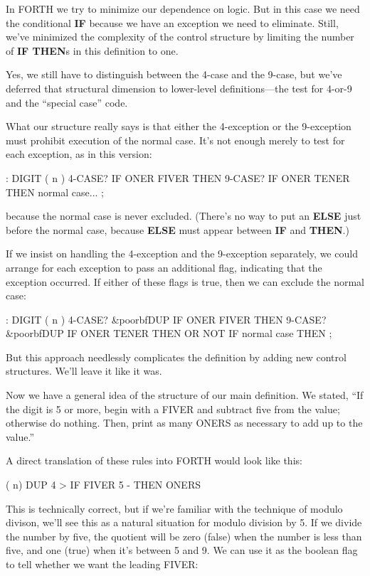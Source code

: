 In FORTH we try to minimize our dependence on logic. But in this
case we need the conditional \textbf{IF} because we have an exception we need to
eliminate. Still, we've minimized the complexity of the control structure
by limiting the number of \textbf{IF THEN}s in this definition to one.

Yes, we still have to distinguish between the 4-case and the 9-case,
but we've deferred that structural dimension to lower-level
definitions---the test for 4-or-9 and the ``special case'' code.

What our structure really says is that either the 4-exception or the
9-exception must prohibit execution of the normal case. It's not enough
merely to test for each exception, as in this version:

\begin{Code}
: DIGIT  ( n )  4-CASE? IF  ONER FIVER  THEN
                9-CASE? IF  ONER TENER  THEN
                normal case... ;
\end{Code}

because the normal case is never excluded. (There's no way to put an
\textbf{ELSE} just before the normal case, because \textbf{ELSE} must appear between
\textbf{IF} and \textbf{THEN}.)

If we insist on handling the 4-exception and the 9-exception
separately, we could arrange for each exception to pass an additional
flag, indicating that the exception occurred. If either of these flags is
true, then we can exclude the normal case:

\begin{Code}[commandchars=\&\{\}]
: DIGIT  ( n )  4-CASE? &poorbf{DUP} IF  ONER FIVER  THEN
                9-CASE? &poorbf{DUP} IF  ONER TENER  THEN
                OR  NOT IF normal case THEN ;
\end{Code}
But this approach needlessly complicates the definition by adding new
control structures. We'll leave it like it was.

Now we have a general idea of the structure of our main definition.
We stated, ``If the digit is 5 or more, begin with a FIVER and subtract
five from the value; otherwise do nothing. Then, print as many
ONERS as necessary to add up to the value.''

A direct translation of these rules into FORTH would look like this:

\begin{Code}
( n)  DUP  4 > IF  FIVER 5 -  THEN  ONERS
\end{Code}
This is technically correct, but if we're familiar with the technique of
modulo divison, we'll see this as a natural situation for modulo division
by 5. If we divide the number by five, the quotient will be zero (false)
when the number is less than five, and one (true) when it's between 5 and
9. We can use it as the boolean flag to tell whether we want the leading
FIVER:


